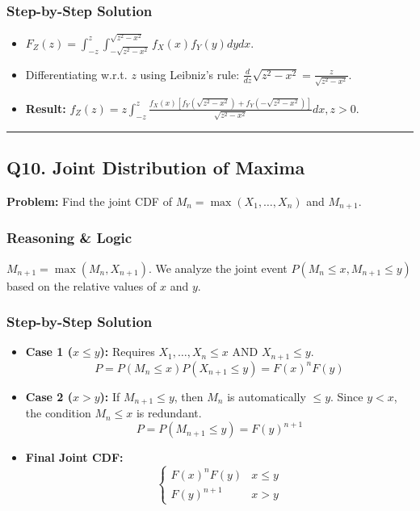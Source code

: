 \documentclass[11pt]{article}
\begin{document}
\subsubsection*{Step-by-Step Solution}
\begin{itemize}
    \item $F_Z(z) = \int_{-z}^{z}\int_{-\sqrt{z^2-x^2}}^{\sqrt{z^2-x^2}}f_X(x)f_Y(y)dy dx$.
    \item Differentiating w.r.t. $z$ using Leibniz's rule: $\frac{d}{dz}\sqrt{z^2-x^2} = \frac{z}{\sqrt{z^2-x^2}}$.
    \item \textbf{Result:} $f_Z(z) = z\int_{-z}^{z}\frac{f_X(x)[f_Y(\sqrt{z^2-x^2}) + f_Y(-\sqrt{z^2-x^2})]}{\sqrt{z^2-x^2}}dx, z>0$.
\end{itemize}

\vspace{0.5cm}
\hrule
\vspace{0.5cm}

\subsection*{Q10. Joint Distribution of Maxima}

\textbf{Problem:} Find the joint CDF of $M_n = \max(X_1, \dots, X_n)$ and $M_{n+1}$.

\subsubsection*{Reasoning \& Logic}
$M_{n+1} = \max(M_n, X_{n+1})$. We analyze the joint event $P(M_n \le x, M_{n+1} \le y)$ based on the relative values of $x$ and $y$.

\subsubsection*{Step-by-Step Solution}
\begin{itemize}
    \item \textbf{Case 1 ($x \le y$):} Requires $X_1, \dots, X_n \le x$ AND $X_{n+1} \le y$.
    \[ P = P(M_n \le x)P(X_{n+1} \le y) = F(x)^n F(y) \]
    \item \textbf{Case 2 ($x > y$):} If $M_{n+1} \le y$, then $M_n$ is automatically $\le y$. Since $y < x$, the condition $M_n \le x$ is redundant.
    \[ P = P(M_{n+1} \le y) = F(y)^{n+1} \]
    \item \textbf{Final Joint CDF:} 
    \[ \begin{cases} F(x)^n F(y) & x \le y \\ F(y)^{n+1} & x > y \end{cases} \]
\end{itemize}
\end{document}
